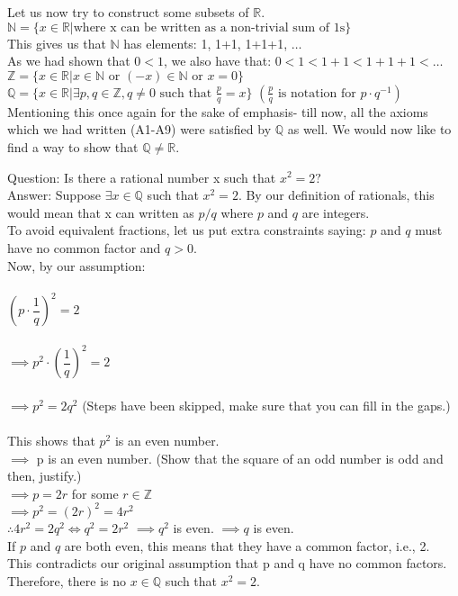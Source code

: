 Let us now try to construct some subsets of $\mathbb{R}$.\\
$\mathbb{N} = \{x \in \mathbb{R} | \text{where x can be written as a non-trivial sum of 1s}\}$\\
This gives us that $\mathbb{N}$ has elements: 1, 1+1, 1+1+1, $\dots$\\
As we had shown that $0<1$, we also have that: $0<1<1+1<1+1+1<\dots$\\
$\mathbb{Z} = \{x \in \mathbb{R} | x \in \mathbb{N} \text{ or } (-x) \in \mathbb{N} \text{ or } x=0\}$\\
$\mathbb{Q} = \{x \in \mathbb{R} | \exists p, q \in \mathbb{Z}, q \neq 0 \text{ such that } \frac{p}{q} = x \}$ %
$\left(\frac{p}{q} \text{ is notation for } p\cdot q^{-1}\right)$\\

Mentioning this once again for the sake of emphasis- till now, all the axioms which we had written (A1-A9) were satisfied by $\mathbb{Q}$ as well. We would now like to find a way to show that $\mathbb{Q} \neq \mathbb{R}$.

\hrulefill

Question: Is there a rational number x such that $x^2=2?$\\
Answer: Suppose $\exists x \in \mathbb{Q}$ such that $x^2 = 2$.
By our definition of rationals, this would mean that x can written as $p/q$ where $p$ and $q$ are integers. \\
To avoid equivalent fractions, let us put extra constraints saying: $p$ and $q$ must have no common factor and $q > 0$.\\
Now, by our assumption:\\~\\
$\left(p\cdot \dfrac{1}{q}\right)^2 = 2$\\~\\
$\implies p^2\cdot\left(\dfrac{1}{q}\right)^2 = 2$\\~\\
$\implies p^2=2q^2$ \hfill (Steps have been skipped, make sure that you can fill in the gaps.)\\~\\
This shows that $p^2$ is an even number.\\
$\implies$ p is an even number. \hfill (Show that the square of an odd number is odd and then, justify.)\\
$\implies p = 2r$ for some $r \in \mathbb{Z}$\\
$\implies p^2=(2r)^2=4r^2$\\
$\therefore 4r^2 = 2q^2 \iff q^2 = 2r^2$
$\implies q^2$ is even. $\implies q$ is even.\\
If $p$ and $q$ are both even, this means that they have a common factor, i.e., 2.\\
This contradicts our original assumption that p and q have no common factors.\\
Therefore, there is no $x \in \mathbb{Q}$ such that $x^2 = 2$. 

